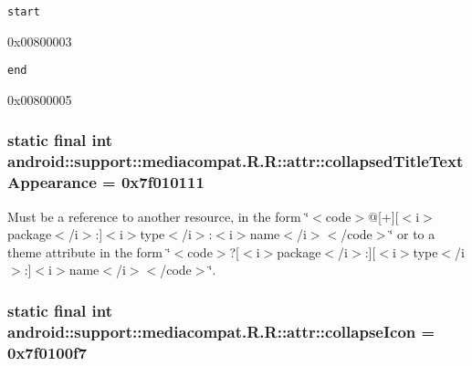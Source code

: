 {\tt start}

0x00800003

{\tt end}

0x00800005\hypertarget{classandroid_1_1support_1_1mediacompat_1_1_r_1_1attr_4ae5727c50a6328901743cde50f82120}{
\subsubsection[{collapsedTitleTextAppearance}]{\setlength{\rightskip}{0pt plus 5cm}static final int android::support::mediacompat.R.R::attr::collapsedTitleTextAppearance = 0x7f010111}}
\label{classandroid_1_1support_1_1mediacompat_1_1_r_1_1attr_4ae5727c50a6328901743cde50f82120}


Must be a reference to another resource, in the form \char`\"{}$<$code$>$@\mbox{[}+\mbox{]}\mbox{[}$<$i$>$package$<$/i$>$:\mbox{]}$<$i$>$type$<$/i$>$:$<$i$>$name$<$/i$>$$<$/code$>$\char`\"{} or to a theme attribute in the form \char`\"{}$<$code$>$?\mbox{[}$<$i$>$package$<$/i$>$:\mbox{]}\mbox{[}$<$i$>$type$<$/i$>$:\mbox{]}$<$i$>$name$<$/i$>$$<$/code$>$\char`\"{}. \hypertarget{classandroid_1_1support_1_1mediacompat_1_1_r_1_1attr_11a6d972b5c87f70ff70d7a33ded2321}{
\subsubsection[{collapseIcon}]{\setlength{\rightskip}{0pt plus 5cm}static final int android::support::mediacompat.R.R::attr::collapseIcon = 0x7f0100f7}}
\label{classandroid_1_1support_1_1mediacompat_1_1_r_1_1attr_11a6d972b5c87f70ff70d7a33ded2321}


